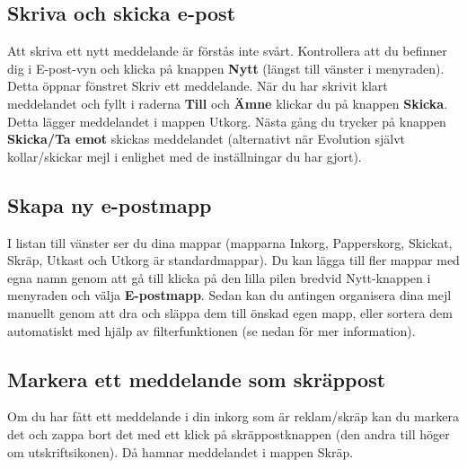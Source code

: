 \documentclass[a4paper,final]{memoir} %
\begin{document}


\subsection{Skriva och skicka e-post}\label{evolution-skicka}


Att skriva ett nytt meddelande är förstås inte svårt. Kontrollera att du befinner dig i E-post-vyn och klicka på knappen \textbf{Nytt} (längst till vänster i menyraden). Detta öppnar fönstret Skriv ett meddelande. När du har skrivit klart meddelandet och fyllt i raderna \textbf{Till} och \textbf{Ämne} klickar du på knappen \textbf{Skicka}. Detta lägger meddelandet i mappen Utkorg. Nästa gång du trycker på knappen \textbf{Skicka/Ta emot} skickas meddelandet (alternativt när Evolution självt kollar/skickar mejl i enlighet med de inställningar du har gjort).


\subsection{Skapa ny e-postmapp}

I listan till vänster ser du dina mappar (mapparna Inkorg, Papperskorg, Skickat, Skräp, Utkast och Utkorg är standardmappar). Du kan lägga till fler mappar med egna namn genom att gå till klicka på den lilla pilen bredvid Nytt-knappen i menyraden och välja \textbf{E-postmapp}. Sedan kan du antingen organisera dina mejl manuellt genom att dra och släppa dem till önskad egen mapp, eller sortera dem automatiskt med hjälp av filterfunktionen (se nedan för mer information). 

\subsection{Markera ett meddelande som skräppost}\label{evolution-junk}


Om du har fått ett meddelande i din inkorg som är reklam/skräp kan du markera det och zappa bort det med ett klick på skräppostknappen (den andra till höger om utskriftsikonen). Då hamnar meddelandet i mappen Skräp.
\end{document}
